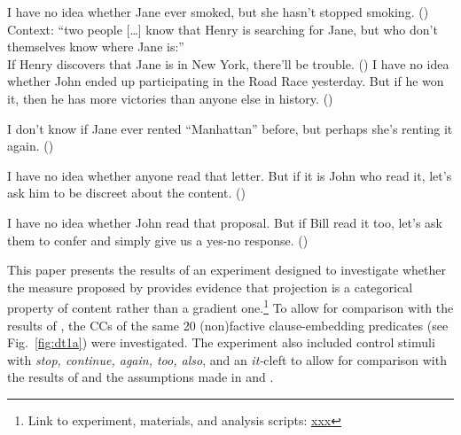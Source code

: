 \documentclass[11pt,fleqn]{article}
\def\infelic{{\leavevmode\llap{\#}}}
\newcommand{\6}{\mbox{$[\hspace*{-.6mm}[$}}
\newcommand{\9}{\mbox{$]\hspace*{-.6mm}]$}}
\begin{document}
\begin{exe}
\ex\label{eic2}
\begin{xlist}
\ex I have no idea whether Jane ever smoked, but she hasn't stopped smoking. \hfill (\citealt[443]{simons01})
\ex Context: ``two people [\ldots] know that Henry is searching for Jane, but who don't themselves know where Jane is:'' \\ If Henry discovers that Jane is in New York, there'll be trouble. \hfill (\citealt[434]{simons01})
\ex I have no idea whether John ended up participating in the
Road Race yesterday. But if he won it, then he has more victories than anyone else in history. \hfill (\citealt[39]{abusch10})
\end{xlist}
\ex\label{eic3}
\begin{xlist}
\ex\infelic I don't know if Jane ever rented ``Manhattan'' before, but perhaps she's renting it again. \hfill (\citealt[443]{simons01})

\ex \infelic I have no idea whether anyone read that letter. But if it is John
who read it, let's ask him to be discreet about the content. \hfill (\citealt[40]{abusch10})

\ex \infelic I have no idea whether John read that proposal. But if Bill read it too, let's ask them to confer and simply give us a yes-no response. \hfill (\citealt[40]{abusch10})
\end{xlist}
\end{exe}

This paper presents the results of an experiment designed to investigate whether the measure proposed by \citealt{mandelkern-etal2020} provides evidence that projection is a categorical property of content rather than a gradient one.\footnote{Link to experiment, materials, and analysis scripts: \url{xxx}}  To allow for comparison with the results of \citealt{degen-tonhauser-language}, the CCs of the same 20 (non)factive clause-embedding predicates (see Fig.~\ref{fig:dt1a}) were investigated. The experiment also included control stimuli with {\em stop, continue, again, too, also}, and an {\em it-}cleft to allow for comparison with the results of \citealt{mandelkern-etal2020} and the assumptions made in \citealt{simons01} and \citealt{abusch10}. 
\end{document}
